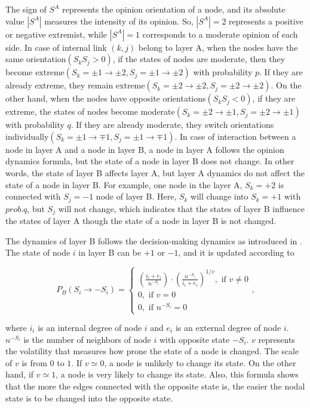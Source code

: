 The sign of $S^A$ represents the opinion orientation of a node, and its absolute value $|S^A|$ measures the intensity of its opinion. So, $|S^A|=2$ represents a positive or negative extremist, while  $|S^A|=1$ corresponds to a moderate opinion of each side. In case of internal link $(k, j)$ belong to layer A, when the nodes have the same orientation$(S_kS_j>0)$, if the states of nodes are moderate, then they become extreme$(S_k=\pm1 \rightarrow \pm2, S_j= \pm1 \rightarrow \pm2)$ with probability $p$. If they are already extreme, they remain extreme$(S_k=\pm2 \rightarrow \pm2, S_j= \pm2 \rightarrow \pm2)$. On the other hand, when the nodes have opposite orientations$(S_kS_j<0)$, if they are extreme, the states of nodes become moderate$(S_k=\pm2 \rightarrow \pm1, S_j= \pm2 \rightarrow \pm1)$ with probability $q$. If they are already moderate, they switch orientations individually$(S_k=\pm1 \rightarrow \mp1, S_j= \pm1 \rightarrow \mp1)$.  In case of interaction between a node in layer A and a node in layer B, a node in layer A follows the opinion dynamics formula, but the state of a node in layer B does not change. In other words, the state of layer B affects layer A, but layer A dynamics do not affect the state of a node in layer B. For example, one node in the layer A, $S_k = +2$ is connected with  $S_j = -1$ node of layer B. Here, $S_k$ will change into $S_k = +1$ with $prob.q$, but $S_j$ will not change, which indicates that the states of layer B influence the states of layer A though the state of a node in layer B is not changed.

The dynamics of layer B follows the decision-making dynamics as introduced in \parencite{abrams2003, vazquez2010}. The state of node $i$ in layer B can be $+1$ or $-1$, and it is updated according to

\begin{equation}
{P_B}({S_i} \to  - {S_i}) = \begin{cases}
{\left({\displaystyle\frac{{{i_i} + {e_i}}}{{{n^{ - {S_i}}}}}}\right)}{\cdot}{\left({\displaystyle\frac{{n^{-{S_i}}}}{{{i_i} + {e_i}}}} \right)^{1/v}}  ,\mbox{ if } v \ne 0\\
0,\mbox{ if } v = 0\\
0,\mbox{ if } {n^{ - {S_i}}} = 0
\end{cases},
\end{equation}

where $i_i$ is an internal degree of node $i$ and $e_i$ is an external degree of node $i$. $n^{-S_i}$ is the number of neighbors of node $i$ with opposite state $-S_i$. $v$ represents the volatility that measures how prone the state of a node is changed. The scale of $v$ is from $0$ to $1$. If $v \simeq 0$,  a node is unlikely to change its state. On the other hand, if $v \simeq 1$, a node is very likely to change its state. Also, this formula shows that the more the edges connected with the opposite state is, the easier the nodal state is to be changed into the opposite state.

